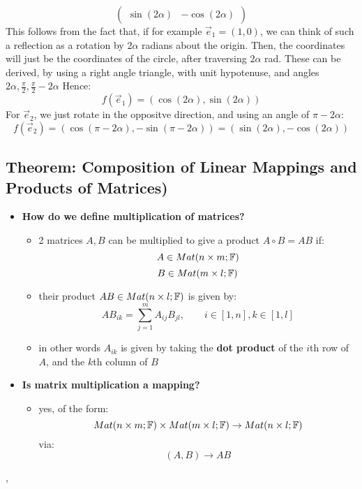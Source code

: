 \documentclass{exam}
\begin{document}
\begin{itemize}
\[\begin{pmatrix}
    \sin(2\alpha) & -\cos(2\alpha)
    \end{pmatrix}
    \]
    This follows from the fact that, if for example $\vec{e}_1 = (1,0)$, we can think of such a reflection as a rotation by $2\alpha$ radians about the origin. Then, the coordinates will just be the coordinates of the circle, after traversing $2\alpha$ rad. These can be derived, by using a right angle triangle, with unit hypotenuse, and angles $2\alpha, \frac{\pi}{2}, \frac{\pi}{2} - 2\alpha$ Hence:
    \[
    f(\vec{e}_1) = (\cos(2\alpha), \sin(2\alpha))
    \]
    For $\vec{e}_2$, we just rotate in the oppositve direction, and using an angle of $\pi - 2\alpha$:
    \[
    f(\vec{e}_2) = (\cos(\pi - 2\alpha), -\sin(\pi - 2\alpha)) = (\sin(2\alpha), -\cos(2\alpha))
    \]
\end{itemize}

\subsection{Theorem: Composition of Linear Mappings and Products of Matrices)}

\begin{itemize}
    \item \textbf{How do we define multiplication of matrices?}
    \begin{itemize}
        \item 2 matrices $A,B$ can be multiplied to give a product $A \circ B = AB$ if:
        \[
        A \in Mat(n \times m; \mathbb{F})
        \]
        \[
        B \in Mat(m\times l; \mathbb{F})
        \]
        \item their product $AB \in Mat(n \times l; \mathbb{F})$ is given by:
        \[
        AB_{ik} = \sum_{j = 1}^m A_{ij}B_{jl}, \qquad i \in [1,n], k \in [1,l]
        \]
        \item in other words $A_{ik}$ is given by taking the \textbf{dot product} of the $i$th row of $A$, and the $k$th column of $B$ 
    \end{itemize}
    \item \textbf{Is matrix multiplication a mapping?}
    \begin{itemize}
        \item yes, of the form:
        \[
        Mat(n \times m; \mathbb{F}) \times Mat(m\times l; \mathbb{F}) \to  Mat(n \times l; \mathbb{F})
        \]
        via:
        \[
        (A,B) \to AB
        \]
    \end{itemize}
\end{itemize}

\sep 
\label{t218}
\end{document}
